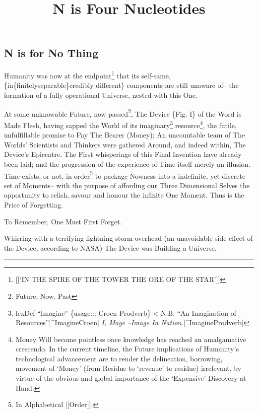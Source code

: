 \documentclass[
]{article}
\title{N is Four Nucleotides}
\author{}
\date{}
\begin{document}
\maketitle

\subsection{N is for No Thing}\label{n-is-for-no-thing}

Humanity was now at the endpoint\footnote{{[}{[}`IN THE SPIRE OF THE
  TOWER THE ORE OF THE STAR'{]}{]}} that its self-same,
\{in\{finitely\textbar separable\}\textbar credibly different\}
components are still unaware of-- the formation of a fully operational
Universe, nested with this One.

At some unknowable Future, now passed\footnote{Future, Now, Past}, The
Device \{Fig. I\} of the Word is Made Flesh, having sapped the World of
its imaginary\footnote{lexDef ``Imagine'' \{usage::: Croen
  \textbar\textbar{} Prodverb\} \textless{} N.B. ``An Imagination of
  Resources''{[}\^{}ImagineCroen{]} \textbar\textbar{} \emph{I, Mage
  --Image In Nation.}{[}\^{}ImagineProdverb{]}} resource\footnote{Money
  Will become pointless once knowledge has reached an amalgamative
  crescendo. In the current timeline, the Future implications of
  Humanity's technological advancement are to render the delineation,
  borrowing, movement of `Money' (from Residue to `revenue' to residue)
  irrelevant, by virtue of the obvious and global importance of the
  `Expensive' Discovery at Hand.}, the futile, unfulfillable promise to
Pay The Bearer (Money); An uncountable team of The Worlds' Scientists
and Thinkers were gathered Around, and indeed within, The Device's
Epicentre. The First whisperings of this Final Invention have already
been laid; and the progression of the experience of Time itself merely
an illusion. Time exists, or not, in order\footnote{In Alphabetical
  {[}{[}Order{]}{]}.} to package Nowness into a indefinite, yet discrete
set of Moments-- with the purpose of affording our Three Dimensional
Selves the opportunity to relish, savour and honour the infinite One
Moment. Thus is the Price of Forgetting.

To Remember, One Must First Forget.

Whirring with a terrifying lightning storm overhead (an unavoidable
side-effect of the Device, according to NASA) The Device was Building a
Universe.

\begin{center}\rule{0.5\linewidth}{0.5pt}\end{center}
\end{document}
